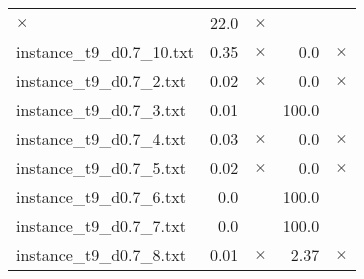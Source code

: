 \documentclass{article}
\begin{document}
\begin{center}
\begin{tabular}{lrrrr}
$\times$
 & 22.0 & 
$\times$
\\
instance\_t9\_d0.7\_10.txt & 0.35 & 
$\times$
 & 0.0 & 
$\times$
\\
instance\_t9\_d0.7\_2.txt & 0.02 & 
$\times$
 & 0.0 & 
$\times$
\\
instance\_t9\_d0.7\_3.txt & 0.01 & 
 & 100.0 & 
\\
instance\_t9\_d0.7\_4.txt & 0.03 & 
$\times$
 & 0.0 & 
$\times$
\\
instance\_t9\_d0.7\_5.txt & 0.02 & 
$\times$
 & 0.0 & 
$\times$
\\
instance\_t9\_d0.7\_6.txt & 0.0 & 
 & 100.0 & 
\\
instance\_t9\_d0.7\_7.txt & 0.0 & 
 & 100.0 & 
\\
instance\_t9\_d0.7\_8.txt & 0.01 & 
$\times$
 & 2.37 & 
$\times$
\\
\hline\end{tabular}
\end{center}
\end{document}
